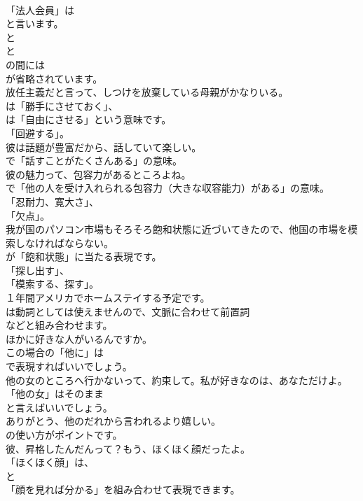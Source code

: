 \documentclass[8pt]{extreport}
\begin{document}
\begin{CJK}{UTF8}{min}
\\	「法人会員」は
\\	と言います。
\\	と
\\	と
\\	の間には
\\	が省略されています。	
\\	放任主義だと言って、しつけを放棄している母親がかなりいる。 
\\	は「勝手にさせておく」、
\\	は「自由にさせる」という意味です。
\\	「回避する」。	
\\	彼は話題が豊富だから、話していて楽しい。 
\\	で「話すことがたくさんある」の意味。	
\\	彼の魅力って、包容力があるところよね。 
\\	で「他の人を受け入れられる包容力（大きな収容能力）がある」の意味。
\\	「忍耐力、寛大さ」、
\\	「欠点」。	
\\	我が国のパソコン市場もそろそろ飽和状態に近づいてきたので、他国の市場を模索しなければならない。 
\\	が「飽和状態」に当たる表現です。
\\	「探し出す」、
\\	「模索する、探す」。	
\\	１年間アメリカでホームステイする予定です。 
\\	は動詞としては使えませんので、文脈に合わせて前置詞
\\	などと組み合わせます。	
\\	ほかに好きな人がいるんですか。 
\\	この場合の「他に」は 
\\	で表現すればいいでしょう。	
\\	他の女のところへ行かないって、約束して。私が好きなのは、あなただけよ。 
\\	「他の女」はそのまま
\\	と言えばいいでしょう。	
\\	ありがとう、他のだれから言われるより嬉しい。 
\\	の使い方がポイントです。	
\\	彼、昇格したんだんって？もう、ほくほく顔だったよ。 
\\	「ほくほく顔」は、
\\	と
\\	「顔を見れば分かる」を組み合わせて表現できます。

\end{CJK}
\end{document}
